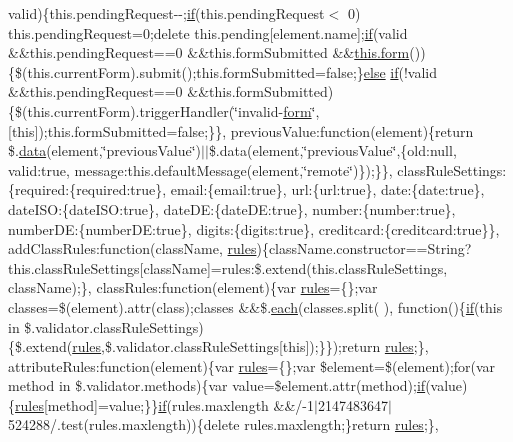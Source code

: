 \begin{DoxyCompactItemize}
valid)\{this.\+pending\+Request-\/-\/;\hyperlink{_scripts_2respond_8min_8js_a93851d60dd037a83509a1757b9ee7b66}{if}(this.\+pending\+Request$<$ 0) this.\+pending\+Request=0;delete this.\+pending\mbox{[}element.\+name\mbox{]};\hyperlink{_scripts_2respond_8min_8js_a93851d60dd037a83509a1757b9ee7b66}{if}(valid \&\&this.\+pending\+Request==0 \&\&this.\+form\+Submitted \&\&\hyperlink{login_8js_acfb5ebf8920e47b6c6d297e6ca2a6ce0}{this.\+form}())\{\$(this.\+current\+Form).submit();this.\+form\+Submitted=false;\}\hyperlink{_scripts_2jquery_8validate_8js_a0544c3fe466e421738dae463968b70ba}{else} \hyperlink{_scripts_2respond_8min_8js_a93851d60dd037a83509a1757b9ee7b66}{if}(!valid \&\&this.\+pending\+Request==0 \&\&this.\+form\+Submitted)\{\$(this.\+current\+Form).trigger\+Handler(\char`\"{}invalid-\/\hyperlink{login_8js_acfb5ebf8920e47b6c6d297e6ca2a6ce0}{form}\char`\"{}, \mbox{[}this\mbox{]});this.\+form\+Submitted=false;\}\}, previous\+Value\+:function(element)\{return \$.\hyperlink{jquery_8unobtrusive-ajax_8min_8js_a8f172ae31c11770303ca0c4cb48ceb3a}{data}(element,\char`\"{}previous\+Value\char`\"{})$\vert$$\vert$\$.data(element,\char`\"{}previous\+Value\char`\"{},\{old\+:null, valid\+:true, message\+:this.\+default\+Message(element,\char`\"{}remote\char`\"{})\});\}\}, class\+Rule\+Settings\+:\{required\+:\{required\+:true\}, email\+:\{email\+:true\}, url\+:\{url\+:true\}, date\+:\{date\+:true\}, date\+I\+S\+O\+:\{date\+I\+S\+O\+:true\}, date\+D\+E\+:\{date\+D\+E\+:true\}, number\+:\{number\+:true\}, number\+D\+E\+:\{number\+D\+E\+:true\}, digits\+:\{digits\+:true\}, creditcard\+:\{creditcard\+:true\}\}, add\+Class\+Rules\+:function(class\+Name, \hyperlink{_scripts_2respond_8js_ada87c2e257bc5ff6e77cdbc23ed986a3}{rules})\{class\+Name.\+constructor==String?this.\+class\+Rule\+Settings\mbox{[}class\+Name\mbox{]}=rules\+:\$.\+extend(this.\+class\+Rule\+Settings, class\+Name);\}, class\+Rules\+:function(element)\{var \hyperlink{_scripts_2respond_8js_ada87c2e257bc5ff6e77cdbc23ed986a3}{rules}=\{\};var classes=\$(element).attr(\textquotesingle{}class\textquotesingle{});classes \&\&\$.\hyperlink{_scripts_2jquery-1_810_82_8min_8js_af24c9ea1e34372f8c8b312b35586008d}{each}(classes.\+split(\textquotesingle{} \textquotesingle{}), function()\{\hyperlink{_scripts_2respond_8min_8js_a93851d60dd037a83509a1757b9ee7b66}{if}(this in \$.validator.\+class\+Rule\+Settings)\{\$.extend(\hyperlink{_scripts_2respond_8js_ada87c2e257bc5ff6e77cdbc23ed986a3}{rules},\$.validator.\+class\+Rule\+Settings\mbox{[}this\mbox{]});\}\});return \hyperlink{_scripts_2respond_8js_ada87c2e257bc5ff6e77cdbc23ed986a3}{rules};\}, attribute\+Rules\+:function(element)\{var \hyperlink{_scripts_2respond_8js_ada87c2e257bc5ff6e77cdbc23ed986a3}{rules}=\{\};var \$element=\$(element);for(var method in \$.validator.\+methods)\{var value=\$element.\+attr(method);\hyperlink{_scripts_2respond_8min_8js_a93851d60dd037a83509a1757b9ee7b66}{if}(value)\{\hyperlink{_scripts_2respond_8js_ada87c2e257bc5ff6e77cdbc23ed986a3}{rules}\mbox{[}method\mbox{]}=value;\}\}\hyperlink{_scripts_2respond_8min_8js_a93851d60dd037a83509a1757b9ee7b66}{if}(rules.\+maxlength \&\&/-\/1$\vert$2147483647$\vert$524288/.test(rules.\+maxlength))\{delete rules.\+maxlength;\}return \hyperlink{_scripts_2respond_8js_ada87c2e257bc5ff6e77cdbc23ed986a3}{rules};\}, 
\end{DoxyCompactItemize}
